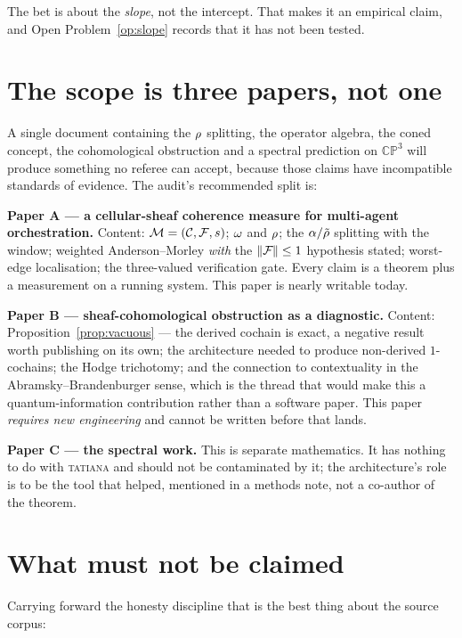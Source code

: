 The bet is about the \emph{slope}, not the intercept. That makes it an
empirical claim, and Open Problem~\ref{op:slope} records that it has not
been tested.

\section{The scope is three papers, not one}

\begin{hon}\Hon
A single document containing the $\rho$ splitting, the operator
algebra, the coned concept, the cohomological obstruction and a spectral
prediction on $\mathbb{CP}^3$ will produce something no referee can
accept, because those claims have incompatible standards of evidence.
The audit's recommended split is:

\textbf{Paper A --- a cellular-sheaf coherence measure for multi-agent
orchestration.} Content: $\mathcal{M}=(\mathcal{C},\mathcal{F},s)$; $\omega$ and $\rho$;
the $\alpha/\tilde{\rho}$ splitting with the window; weighted
Anderson--Morley \emph{with} the $\left\lVert \mathcal{F}_{} \right\rVert\le1$ hypothesis stated;
worst-edge localisation; the three-valued verification gate. Every claim
is a theorem plus a measurement on a running system. This paper is
nearly writable today.

\textbf{Paper B --- sheaf-cohomological obstruction as a diagnostic.}
Content: Proposition~\ref{prop:vacuous} --- the derived cochain is exact,
a negative result worth publishing on its own; the architecture needed
to produce non-derived $1$-cochains; the Hodge trichotomy; and the
connection to contextuality in the Abramsky--Brandenburger sense, which
is the thread that would make this a quantum-information contribution
rather than a software paper. This paper \emph{requires new engineering}
and cannot be written before that lands.

\textbf{Paper C --- the spectral work.} This is separate mathematics. It
has nothing to do with \textsc{tatiana} and should not be contaminated
by it; the architecture's role is to be the tool that helped, mentioned
in a methods note, not a co-author of the theorem.
\end{hon}

\section{What must not be claimed}

Carrying forward the honesty discipline that is the best thing about the
source corpus:

